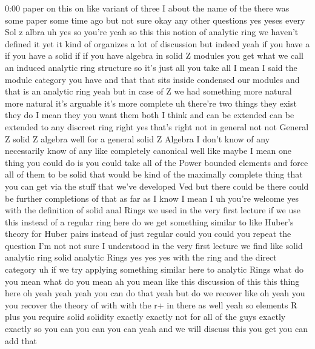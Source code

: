 \begin{unfinished}{0:00}
paper  on  this  on
like  variant  of
three  I  about  the  name  of  the  there  was
some  paper  some  time  ago  but  not
sure
okay  any  other  questions  yes
yeses  every  Sol  z
albra  uh  yes  so  you're  yeah  so  this  this
notion  of  analytic  ring  we  haven't
defined  it  yet  it  kind  of  organizes  a
lot  of  discussion  but  indeed  yeah  if  you
have  a  if  you  have  a  solid  if  if  you
have  algebra  in  solid  Z  modules  you  get
what  we  call  an  induced  analytic  ring
structure  so  it's  just  all  you  take  all
I  mean  I  said  the  module  category  you
have  and  that  that  sits  inside  condensed
our  modules  and  that  is  an  analytic  ring
yeah  but  in  case  of  Z  we  had  something
more
natural  more  natural  it's  arguable  it's
more  complete  uh  there're  two  things
they  exist  they  do  I  mean  they  you  want
them  both  I
think
and  can  be  extended  can  be  extended  to
any  discreet  ring  right  yes  that's
right  not  in  general  not  not  General  Z
solid  Z  algebra  well  for  a  general  solid
Z  Algebra  I  don't  know  of  any
necessarily  know  of  any  like  completely
canonical  well  like  maybe  I  mean  one
thing  you  could  do  is  you  could  take  all
of  the  Power  bounded  elements  and  force
all  of  them  to  be  solid  that  would  be
kind  of  the  maximally  complete  thing
that  you  can  get  via  the  stuff  that
we've  developed  Ved  but  there  could  be
there  could  be  further  completions  of
that  as  far  as  I  know  I  mean  I
uh  you're  welcome  yes  with  the
definition  of  solid  anal  Rings  we  used
in  the  very  first  lecture  if  we  use  this
instead  of  a  regular  ring  here  do  we  get
something  similar  to  like  Huber's  theory
for  Huber  pairs  instead  of  just
regular  could  you  could  you  repeat  the
question  I'm  not  not  sure  I  understood
in  the  very  first  lecture  we  find  like
solid  analytic  ring  solid  analytic  Rings
yes  yes  yes  with  the  ring  and  the  direct
category  uh  if  we  try  applying  something
similar  here  to  analytic  Rings  what  do
you  mean  what  do  you
mean  ah  you  mean  like  this  discussion  of
this  this  thing  here  oh  yeah  yeah  yeah
you  can  do  that  yeah  but  do  we  recover
like  oh  yeah  you  you  recover  the  theory
of  with  with  the  r+  in  there  as  well
yeah  so  elements  R  plus  you  require
solid  solidity  exactly  exactly  not  for
all  of  the  guys  exactly  exactly  so  you
can  you  can  you  can  yeah  and  we  will
discuss  this  you  get  you  can  add  that

\end{unfinished}
